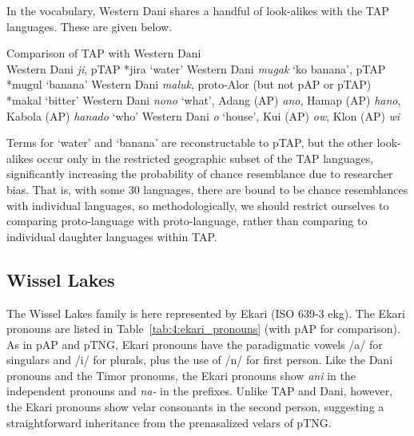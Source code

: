 In the vocabulary, Western Dani shares a handful of look-alikes with the TAP languages. These are given below.

\ea%
\label{ex:4:58}
\upshape 
  Comparison of TAP with Western Dani \citep{PurbaEtAl1993} \\
  \ea \upshape  Western Dani \textit{ji}, pTAP *jira `water'
  \ex  \upshape Western Dani \textit{mugak} `ko banana', pTAP *mugul `banana'
  \ex \upshape  Western Dani \textit{maluk}, proto-Alor (but not pAP or pTAP) *makal `bitter'
  \ex \upshape  Western Dani \textit{nono} `what',  Adang (AP) \textit{ano}, Hamap (AP) \textit{hano}, Kabola (AP) \textit{hanado} `who'
  \ex \upshape  Western Dani \textit{o} `house', Kui (AP) \textit{ow}, Klon (AP) \textit{{\textschwa}}\textit{wi}
  \z
\z


Terms for `water' and `banana' are reconstructable to pTAP, but the other look-alikes occur only in the restricted geographic subset of the TAP languages, significantly increasing the probability of chance resemblance due to researcher bias. That is, with some 30 languages, there are bound to be chance resemblances with individual languages, so methodologically, we should restrict ourselves to comparing proto-language with proto-language, rather than comparing to individual daughter languages within TAP.

\subsection{Wissel Lakes}
The Wissel Lakes family is here represented by Ekari (ISO 639-3 ekg). The Ekari pronouns are listed in Table~\ref{tab:4:ekari_pronouns} (with pAP for comparison). As in pAP and pTNG, Ekari pronouns have the paradigmatic vowels /a/ for singulars and /i/ for plurals, plus the use of /n/ for first person. Like the Dani pronouns and the Timor pronouns, the Ekari pronouns show \textit{ani} in the independent pronouns and \textit{na-} in the prefixes. Unlike TAP and Dani, however, the Ekari pronouns show velar consonants in the second person, suggesting a straightforward inheritance from the prenasalized velars of pTNG.



